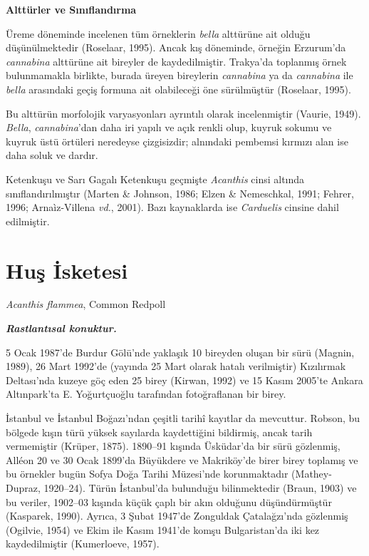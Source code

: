 \documentclass[
  10.5pt,
  a4paper,
  DIV=11,
  numbers=noendperiod,
  twocolumn]{scrreprt}
\begin{document}
\textbf{Alttürler ve Sınıflandırma}

Üreme döneminde incelenen tüm örneklerin \emph{bella} alttürüne ait
olduğu düşünülmektedir (Roselaar, 1995). Ancak kış döneminde, örneğin
Erzurum'da \emph{cannabina} alttürüne ait bireyler de kaydedilmiştir.
Trakya'da toplanmış örnek bulunmamakla birlikte, burada üreyen
bireylerin \emph{cannabina} ya da \emph{cannabina} ile \emph{bella}
arasındaki geçiş formuna ait olabileceği öne sürülmüştür (Roselaar,
1995).

Bu alttürün morfolojik varyasyonları ayrıntılı olarak incelenmiştir
(Vaurie, 1949). \emph{Bella}, \emph{cannabina}'dan daha iri yapılı ve
açık renkli olup, kuyruk sokumu ve kuyruk üstü örtüleri neredeyse
çizgisizdir; alnındaki pembemsi kırmızı alan ise daha soluk ve dardır.

Ketenkuşu ve Sarı Gagalı Ketenkuşu geçmişte \emph{Acanthis} cinsi
altında sınıflandırılmıştır (Marten \& Johnson, 1986; Elzen \&
Nemeschkal, 1991; Fehrer, 1996; Arnaìz-Villena \emph{vd.}, 2001). Bazı
kaynaklarda ise \emph{Carduelis} cinsine dahil edilmiştir.

\section{Huş İsketesi}\label{huux15f-isketesi}

\emph{Acanthis flammea}, Common Redpoll

\textbf{\emph{Rastlantısal konuktur.}}

5 Ocak 1987'de Burdur Gölü'nde yaklaşık 10 bireyden oluşan bir sürü
(Magnin, 1989), 26 Mart 1992'de (yayında 25 Mart olarak hatalı
verilmiştir) Kızılırmak Deltası'nda kuzeye göç eden 25 birey (Kirwan,
1992) ve 15 Kasım 2005'te Ankara Altınpark'ta E. Yoğurtçuoğlu tarafından
fotoğraflanan bir birey.

İstanbul ve İstanbul Boğazı'ndan çeşitli tarihî kayıtlar da mevcuttur.
Robson, bu bölgede kışın türü yüksek sayılarda kaydettiğini bildirmiş,
ancak tarih vermemiştir (Krüper, 1875). 1890--91 kışında Üsküdar'da bir
sürü gözlenmiş, Alléon 20 ve 30 Ocak 1899'da Büyükdere ve Makriköy'de
birer birey toplamış ve bu örnekler bugün Sofya Doğa Tarihi Müzesi'nde
korunmaktadır (Mathey-Dupraz, 1920--24). Türün İstanbul'da bulunduğu
bilinmektedir (Braun, 1903) ve bu veriler, 1902--03 kışında küçük çaplı
bir akın olduğunu düşündürmüştür (Kasparek, 1990). Ayrıca, 3 Şubat
1947'de Zonguldak Çatalağzı'nda gözlenmiş (Ogilvie, 1954) ve Ekim ile
Kasım 1941'de komşu Bulgaristan'da iki kez kaydedilmiştir (Kumerloeve,
1957).
\end{document}
